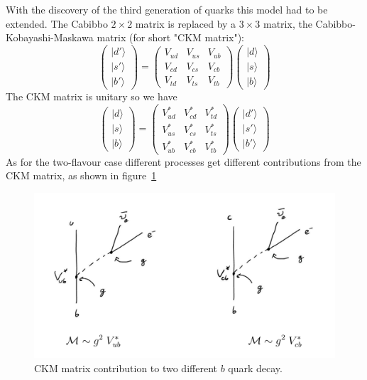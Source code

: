 \documentclass[12pt]{article}
\begin{document}
With the discovery of the third generation of quarks this model had to be extended. The Cabibbo $2\times 2$ matrix is replaced by a $3\times 3$ matrix, the Cabibbo-Kobayashi-Maskawa matrix (for short "CKM matrix"):
\[
\left(\begin{array}{c}
|d'\rangle \\ 
|s'\rangle \\ 
|b'\rangle 
\end{array}\right)
=\left(\begin{array}{ccc}
V_{ud}&V_{us}&V_{ub}\\
V_{cd}&V_{cs}&V_{cb}\\
V_{td}&V_{ts}&V_{tb}
\end{array}\right)
\left(\begin{array}{c}
|d\rangle\\ 
|s\rangle\\ 
|b\rangle
\end{array}\right)
\]
The CKM matrix is unitary so we have 
\[
\left(\begin{array}{c}
|d\rangle \\ 
|s\rangle \\ 
|b\rangle 
\end{array}\right)
=\left(\begin{array}{ccc}
V_{ud}^*&V_{cd}^*&V_{td}^*\\
V_{us}^*&V_{cs}^*&V_{ts}^*\\
V_{ub}^*&V_{cb}^*&V_{tb}^*
\end{array}\right)
\left(\begin{array}{c}
|d'\rangle\\ 
|s'\rangle\\ 
|b'\rangle
\end{array}\right)
\]
As for the two-flavour case different processes get different contributions from the CKM matrix, as shown in figure~\ref{fig:CKMprocesses}
\begin{figure}
\begin{center}
\includegraphics[scale=0.2]{images/CKMVubVcb.png}
\end{center}
\caption{CKM matrix contribution to two different $b$ quark decay.}\label{fig:CKMprocesses}
\end{figure}
\end{document}
